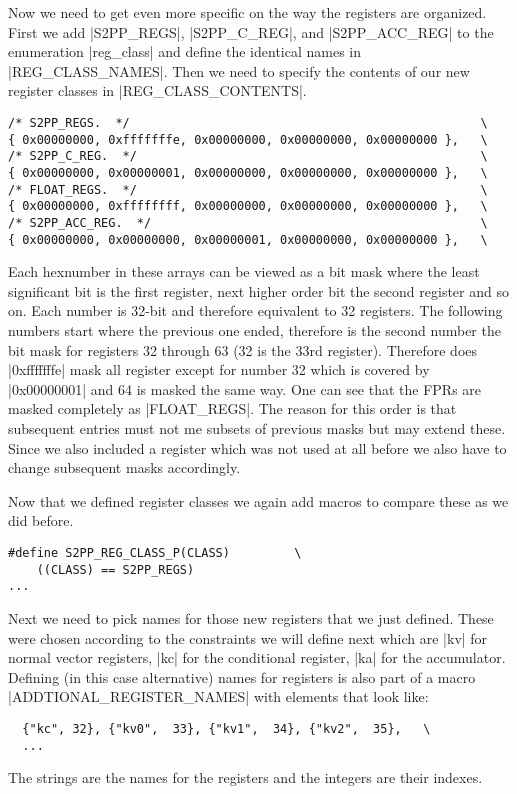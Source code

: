 Now we need to get even more specific on the way the registers are organized.
First we add |S2PP_REGS|, |S2PP_C_REG|, and |S2PP_ACC_REG| to the enumeration |reg_class| and define the identical names in |REG_CLASS_NAMES|.
Then we need to specify the contents of our new register classes in |REG_CLASS_CONTENTS|.
\begin{lstlisting}
/* S2PP_REGS.  */                                                 \
{ 0x00000000, 0xfffffffe, 0x00000000, 0x00000000, 0x00000000 },   \
/* S2PP_C_REG.  */                                                \
{ 0x00000000, 0x00000001, 0x00000000, 0x00000000, 0x00000000 },   \
/* FLOAT_REGS.  */                                                \
{ 0x00000000, 0xffffffff, 0x00000000, 0x00000000, 0x00000000 },   \
/* S2PP_ACC_REG.  */                                              \
{ 0x00000000, 0x00000000, 0x00000001, 0x00000000, 0x00000000 },   \
\end{lstlisting}
Each hexnumber in these arrays can be viewed as a bit mask where the least significant bit is the first register, next higher order bit the second register and so on.
Each number is 32-bit and therefore equivalent to 32 registers.
The following numbers start where the previous one ended, therefore is the second number the bit mask for registers 32 through 63 (32 is the 33rd register).
Therefore does |0xfffffffe| mask all register except for number 32 which is covered by |0x00000001| and 64 is masked the same way.
One can see that the FPRs are masked completely as |FLOAT_REGS|.
The reason for this order is that subsequent entries must not me subsets of previous masks but may extend these.
Since we also included a register which was not used at all before we also have to change subsequent masks accordingly.

Now that we defined register classes we again add macros to compare these as we did before.
\begin{lstlisting}
#define S2PP_REG_CLASS_P(CLASS)         \
    ((CLASS) == S2PP_REGS)
...
\end{lstlisting}

Next we need to pick names for those new registers that we just defined.
These were chosen according to the constraints we will define next which are |kv| for normal vector registers, |kc| for the conditional register, |ka| for the accumulator.
Defining (in this case alternative) names for registers is also part of a macro |ADDTIONAL_REGISTER_NAMES| with elements that look like:
\begin{lstlisting}
  {"kc", 32}, {"kv0",  33}, {"kv1",  34}, {"kv2",  35},   \
  ...
\end{lstlisting}
The strings are the names for the registers and the integers are their indexes.

